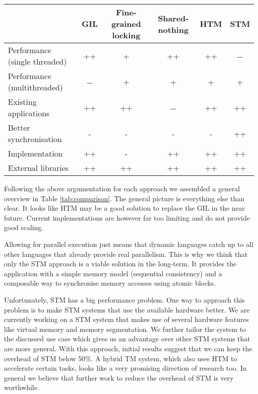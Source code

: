 \documentclass{sigplanconf}
\begin{document}
\begin{table*}[!ht]
  \centering
  \begin{tabular}{|l|c|c|c|c|c|}
    \hline
    & \textbf{GIL} & \textbf{Fine-grained locking}
    & \textbf{Shared-nothing} & \textbf{HTM} & \textbf{STM}\\
    \hline
    Performance (single threaded) & ++   & +  & ++   & ++ & -{-} \\
    \hline
    Performance (multithreaded)   & -{-} & +  & +    & +  & +    \\
    \hline
    Existing applications         & ++   & ++ & -{-} & ++ & ++   \\
    \hline
    Better synchronisation        & -    & -  & -    & -  & ++   \\
    \hline
    Implementation                & ++   & -  & ++   & ++ & ++   \\
    \hline
    External libraries            & ++   & ++ & ++   & ++ & ++   \\
    \hline
  \end{tabular}
  \caption{Comparison between the approaches (-{-}/-/o/+/++)}
  \label{tab:comparison}
\end{table*}


Following the above argumentation for each approach we assembled a
general overview in Table \ref{tab:comparison}. The general picture is
everything else than clear. It looks like HTM may be a good solution
to replace the GIL in the near future. Current implementations are
however far too limiting and do not provide good scaling.

Allowing for parallel execution just means that dynamic languages
catch up to all other languages that already provide real
parallelism. This is why we think that only the STM approach is a
viable solution in the long-term. It provides the application with a
simple memory model (sequential consistency) and a composable way to
synchronise memory accesses using atomic blocks.

Unfortunately, STM has a big performance problem. One way to approach
this problem is to make STM systems that use the available hardware
better. We are currently working on a STM system that makes use of
several hardware features like virtual memory and memory segmentation.
We further tailor the system to the discussed use case which gives us
an advantage over other STM systems that are more general. With this
approach, initial results suggest that we can keep the overhead of STM
below 50\%. A hybrid TM system, which also uses HTM to accelerate
certain tasks, looks like a very promising direction of research
too. In general we believe that further work to reduce the overhead of
STM is very worthwhile.
\end{document}

